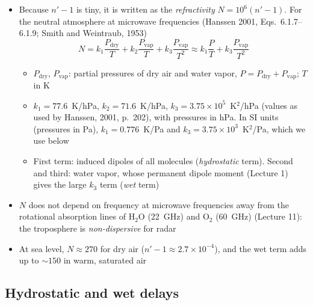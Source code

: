 \documentclass[11pt, oneside]{article}
\newcommand{\Pvap}{P_\mathrm{vap}}
\newcommand{\Pdry}{P_\mathrm{dry}}
\begin{document}
\begin{itemize}
	\item Because $n' - 1$ is tiny, it is written as the \emph{refractivity} $N = 10^6(n' - 1)$. For the neutral atmosphere at microwave frequencies (Hanssen 2001, Eqs.~6.1.7--6.1.9; Smith and Weintraub, 1953)
	\begin{equation}
		\label{e:N}
		N = k_1\frac{\Pdry}{T} + k_2\frac{\Pvap}{T} + k_3\frac{\Pvap}{T^2} \approx k_1\frac{P}{T} + k_3\frac{\Pvap}{T^2}
	\end{equation}
	\begin{itemize}
		\item[] $\Pdry$, $\Pvap$: partial pressures of dry air and water vapor, $P = \Pdry + \Pvap$; $T$ in K
		\item[] $k_1 = 77.6$~K/hPa, $k_2 = 71.6$~K/hPa, $k_3 = 3.75\times10^5$~K$^2$/hPa (values as used by Hanssen, 2001, p.~202), with pressures in hPa. In SI units (pressures in Pa), $k_1 = 0.776$~K/Pa and $k_3 = 3.75\times10^3$~K$^2$/Pa, which we use below
		\item First term: induced dipoles of all molecules (\emph{hydrostatic} term). Second and third: water vapor, whose permanent dipole moment (Lecture 1) gives the large $k_3$ term (\emph{wet} term)
	\end{itemize}
	\item $N$ does not depend on frequency at microwave frequencies away from the rotational absorption lines of H$_2$O (22~GHz) and O$_2$ (60~GHz) (Lecture 11): the troposphere is \emph{non-dispersive} for radar
	\item At sea level, $N \approx 270$ for dry air ($n' - 1 \approx 2.7\times10^{-4}$), and the wet term adds up to $\sim$$150$ in warm, saturated air
\end{itemize}

\subsection{Hydrostatic and wet delays}
\end{document}
